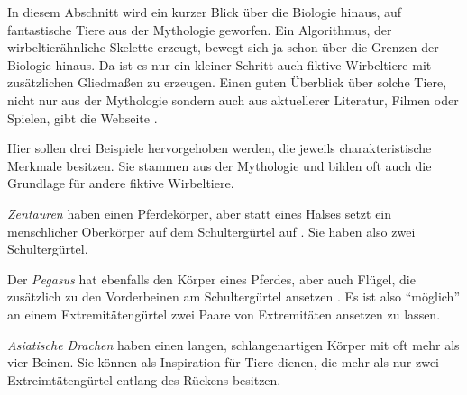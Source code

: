 In diesem Abschnitt wird ein kurzer Blick über die Biologie hinaus, auf fantastische Tiere aus der Mythologie geworfen. 
Ein Algorithmus, der wirbeltierähnliche Skelette erzeugt, bewegt sich ja schon über die Grenzen der Biologie hinaus. Da ist es nur ein kleiner Schritt auch fiktive Wirbeltiere mit zusätzlichen Gliedmaßen zu erzeugen.
Einen guten Überblick über solche Tiere, nicht nur aus der Mythologie sondern auch aus aktuellerer Literatur, Filmen oder Spielen, gibt die Webseite \cite{vertebrateExtraLimbs}.

Hier sollen drei Beispiele hervorgehoben werden, die jeweils charakteristische Merkmale besitzen. Sie stammen aus der Mythologie und bilden oft auch die Grundlage für andere fiktive Wirbeltiere.

\emph{Zentauren} haben einen Pferdekörper, aber statt eines Halses setzt ein menschlicher Oberkörper auf dem Schultergürtel auf \cite{centaurs}. Sie haben also zwei Schultergürtel. 

Der \emph{Pegasus} hat ebenfalls den Körper eines Pferdes, aber auch Flügel, die zusätzlich zu den Vorderbeinen am Schultergürtel ansetzen \cite{pegasus}. Es ist also "`möglich"' an einem Extremitätengürtel zwei Paare von Extremitäten ansetzen zu lassen.

\emph{Asiatische Drachen} haben einen langen, schlangenartigen Körper mit oft mehr als vier Beinen. Sie können als Inspiration für Tiere dienen, die mehr als nur zwei Extreimtätengürtel entlang des Rückens besitzen.

